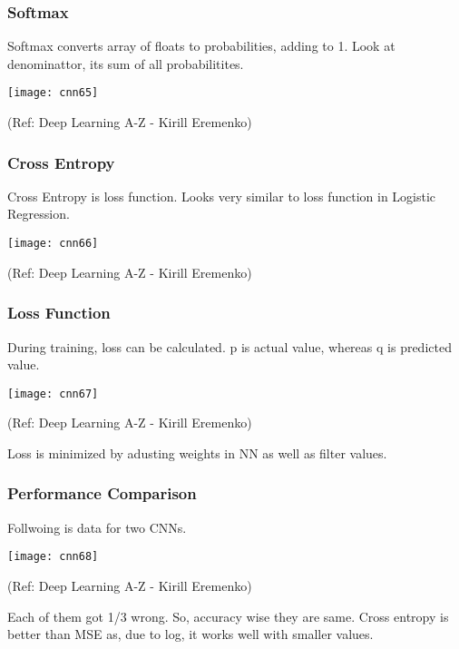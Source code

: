 \begin{frame}[fragile] \frametitle{Softmax}

Softmax converts array of floats to probabilities, adding to 1. Look at denominattor, its sum of all probabilitites.

\begin{center}
\texttt{[image: cnn65]}

\tiny{(Ref: Deep Learning A-Z - Kirill Eremenko)}
\end{center}


\end{frame}

\begin{frame}[fragile] \frametitle{Cross Entropy}

Cross Entropy is loss function. Looks very similar to loss function in Logistic Regression.

\begin{center}
\texttt{[image: cnn66]}

\tiny{(Ref: Deep Learning A-Z - Kirill Eremenko)}
\end{center}


\end{frame}


\begin{frame}[fragile] \frametitle{Loss Function}

During training, loss can be calculated. p is actual value, whereas q is predicted value.

\begin{center}
\texttt{[image: cnn67]}

\tiny{(Ref: Deep Learning A-Z - Kirill Eremenko)}
\end{center}

Loss is minimized by adusting weights in NN as well as filter values.
\end{frame}


\begin{frame}[fragile] \frametitle{Performance Comparison}

Follwoing is data for two CNNs.

\begin{center}
\texttt{[image: cnn68]}

\tiny{(Ref: Deep Learning A-Z - Kirill Eremenko)}
\end{center}

Each of them got 1/3 wrong. So, accuracy wise they are same. Cross entropy is better than MSE as, due to log, it works well with smaller values.
\end{frame}



